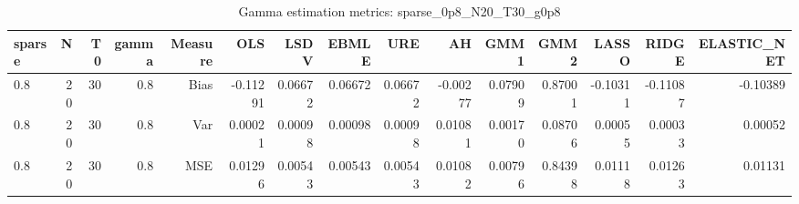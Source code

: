 \begin{table}[!htbp]\centering
\caption{Gamma estimation metrics: sparse_0p8_N20_T30_g0p8}
\label{tab:table1_sparse_0p8_N20_T30_g0p8}
\begin{tabular}{lrrrrrrrrrrrrrr}
\hline
sparse & N & T0 & gamma & Measure & OLS & LSDV & EBMLE & URE & AH & GMM1 & GMM2 & LASSO & RIDGE & ELASTIC_NET \\
\hline
0.8 & 20 & 30 & 0.8 & Bias & -0.11291 & 0.06672 & 0.06672 & 0.06672 & -0.00277 & 0.07909 & 0.87001 & -0.10311 & -0.11087 & -0.10389 \\
0.8 & 20 & 30 & 0.8 & Var & 0.00021 & 0.00098 & 0.00098 & 0.00098 & 0.01081 & 0.00170 & 0.08706 & 0.00055 & 0.00033 & 0.00052 \\
0.8 & 20 & 30 & 0.8 & MSE & 0.01296 & 0.00543 & 0.00543 & 0.00543 & 0.01082 & 0.00796 & 0.84398 & 0.01118 & 0.01263 & 0.01131 \\
\hline
\end{tabular}
\end{table}

